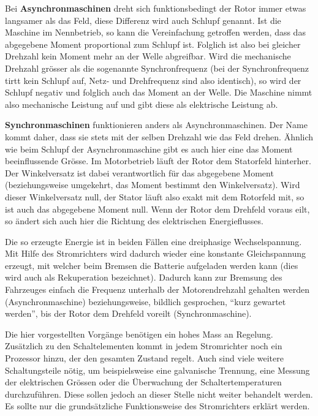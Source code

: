 Bei \textbf{Asynchronmaschinen} dreht sich funktionsbedingt der Rotor immer etwas langsamer als das Feld, diese Differenz wird auch Schlupf genannt. Ist die Maschine im Nennbetrieb, so kann die Vereinfachung getroffen werden, dass das abgegebene Moment proportional zum Schlupf ist. Folglich ist also bei gleicher Drehzahl kein Moment mehr an der Welle abgreifbar. Wird die mechanische Drehzahl grösser als die sogenannte Synchronfrequenz (bei der Synchronfrequenz tirtt kein Schlupf auf, Netz- und Drehfrequenz sind also identisch), so wird der Schlupf negativ und folglich auch das Moment an der Welle. Die Maschine nimmt also mechanische Leistung auf und gibt diese als elektrische Leistung ab.

\textbf{Synchronmaschinen} funktionieren anders als Asynchronmaschinen. Der Name kommt daher, dass sie stets mit der selben Drehzahl wie das Feld drehen. Ähnlich wie beim Schlupf der Asynchronmaschine gibt es auch hier eine das Moment beeinflussende Grösse. Im Motorbetrieb läuft der Rotor dem Statorfeld hinterher. Der Winkelversatz ist dabei verantwortlich für das abgegebene Moment (beziehungsweise umgekehrt, das Moment bestimmt den Winkelversatz). Wird dieser Winkelversatz null, der Stator läuft also exakt mit dem Rotorfeld mit, so ist auch das abgegebene Moment null. Wenn der Rotor dem Drehfeld voraus eilt, so ändert sich auch hier die Richtung des elektrischen Energieflusses.

Die so erzeugte Energie ist in beiden Fällen eine dreiphasige Wechselspannung. Mit Hilfe des Stromrichters wird dadurch wieder eine konstante Gleichspannung erzeugt, mit welcher beim Bremsen die Batterie aufgeladen werden kann (dies wird auch als Rekuperation bezeichnet). Dadurch kann zur Bremsung des Fahrzeuges einfach die Frequenz unterhalb der Motorendrehzahl gehalten werden (Asynchronmaschine) beziehungsweise, bildlich gesprochen, "`kurz gewartet werden"', bis der Rotor dem Drehfeld voreilt (Synchronmaschine).

Die hier vorgestellten Vorgänge benötigen ein hohes Mass an Regelung. Zusätzlich zu den Schaltelementen kommt in jedem Stromrichter noch ein Prozessor hinzu, der den gesamten Zustand regelt. Auch sind viele weitere Schaltungsteile nötig, um beispielsweise eine galvanische Trennung, eine Messung der elektrischen Grössen oder die Überwachung der Schaltertemperaturen durchzuführen. Diese sollen jedoch an dieser Stelle nicht weiter behandelt werden. Es sollte nur die grundsätzliche Funktionsweise des Stromrichters erklärt werden.


